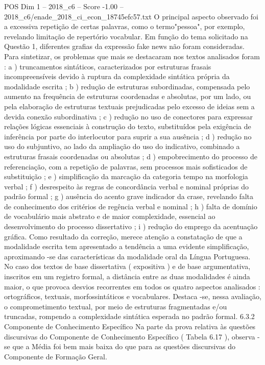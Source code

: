 \begin{textsample}{POS Dim 1 – 2018\_c6 – Score -1.00 – 2018\_c6/enade\_2018\_ci\_econ\_18745efc57.txt}
O principal aspecto observado foi a excessiva repetição de certas palavras, como o termo"pessoa", por exemplo, revelando limitação de repertório vocabular.
Em função do tema solicitado na Questão 1, diferentes grafias da expressão fake news não foram consideradas.
Para sintetizar, os problemas que mais se destacaram nos textos analisados foram : a ) truncamentos sintáticos, caracterizados por estruturas frasais incompreensíveis devido à ruptura da complexidade sintática própria da modalidade escrita ; b ) redução de estruturas subordinadas, compensada pelo aumento na frequência de estruturas coordenadas e absolutas, por um lado, ou pela elaboração de estruturas textuais prejudicadas pelo excesso de ideias sem a devida conexão subordinativa ; c ) redução no uso de conectores para expressar relações lógicas essenciais à construção do texto, substituídos pela exigência de inferência por parte do interlocutor para suprir a sua ausência ; d ) redução no uso do subjuntivo, ao lado da ampliação do uso do indicativo, combinado a estruturas frasais coordenadas ou absolutas ; d ) empobrecimento do processo de referenciação, com a repetição de palavras, sem processos mais sofisticados de substituição ; e ) simplificação da marcação da categoria tempo na morfologia verbal ; f ) desrespeito às regras de concordância verbal e nominal próprias do padrão formal ; g ) ausência do acento grave indicador da crase, revelando falta de conhecimento dos critérios de regência verbal e nominal ; h ) falta de domínio de vocabulário mais abstrato e de maior complexidade, essencial ao desenvolvimento do processo dissertativo ; i ) redução do emprego da acentuação gráfica.
Como resultado da correção, merece atenção a constatação de que a modalidade escrita tem apresentado a tendência a uma evidente simplificação, aproximando -se das características da modalidade oral da Língua Portuguesa.
No caso dos textos de base dissertativa ( expositiva ) e de base argumentativa, inscritos em um registro formal, a distância entre as duas modalidades é ainda maior, o que provoca desvios recorrentes em todos os quatro aspectos analisados : ortográficos, textuais, morfossintáticos e vocabulares.
Destaca -se, nessa avaliação, o comprometimento textual, por meio de estruturas fragmentadas e/ou truncadas, rompendo a complexidade sintática esperada no padrão formal. 6.3.2 Componente de Conhecimento Específico Na parte da prova relativa às questões discursivas do Componente de Conhecimento Específico ( Tabela 6.17 ), observa -se que a Média foi bem mais baixa do que para as questões discursivas do Componente de Formação Geral.

\end{textsample}
